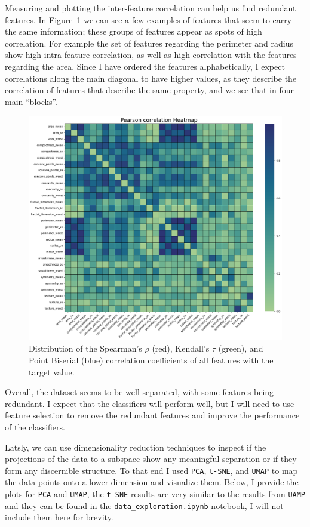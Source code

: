 \documentclass[12pt]{article}
\begin{document}
Measuring and plotting the inter-feature correlation can help us find redundant
features. In Figure~\ref{fig:corr_coeffs_heatmap} we can see a few examples of
features that seem to carry the same information; these groups of features
appear as spots of high correlation. For example the set of features regarding
the perimeter and radius show high intra-feature correlation, as well as high
correlation with the features regarding the area. Since I have ordered the
features alphabetically, I expect correlations along the main diagonal to
have higher values, as they describe the correlation of features that
describe the same property, and we see that in four main ``blocks''.

\begin{figure}[H]
    \centering
    \includegraphics[width=\textwidth]{ims/corr_coeffs_heatmap.png}
    \caption{Distribution of the Spearman's $\rho$ (red), Kendall's $\tau$
    (green), and Point Biserial (blue) correlation coefficients of all features
    with the target value.}
    \label{fig:corr_coeffs_heatmap}
\end{figure}

Overall, the dataset seems to be well separated, with some features being
redundant. I expect that the classifiers will perform well, but I will need to
use feature selection to remove the redundant features and improve the
performance of the classifiers.

Latsly, we can use dimensionality reduction techniques to inspect if the
projections of the data to a subspace show any meaningful separation or if they
form any discernible structure. To that end I used \texttt{PCA}, \texttt{t-SNE},
and \texttt{UMAP} to map the data points onto a lower dimension and visualize
them. Below, I provide the plots for \texttt{PCA} and \texttt{UMAP}, the
\texttt{t-SNE} results are very similar to the results from \texttt{UAMP} and
they can be found in the \texttt{data\_exploration.ipynb} notebook, I will not
include them here for brevity.
\end{document}
